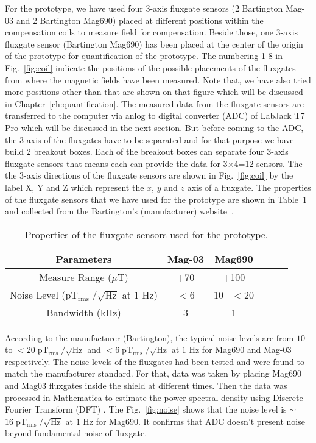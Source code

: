 For the prototype, we have used four 3-axis fluxgate sensors (2 Bartington Mag-03 and 2 Bartington Mag690) placed at different positions within the compensation coils to measure field for compensation. Beside those, one 3-axis fluxgate sensor (Bartington Mag690) has been placed at the center of the origin of the prototype for quantification of the prototype. The numbering 1-8 in Fig.~\ref{fig:coil} indicate the positions of the possible placements of the fluxgates from where the magnetic fields have been measured. Note that, we have also tried more positions other than that are shown on that figure which will be discussed in Chapter~\ref{ch:quantification}.  The measured data from the fluxgate sensors are transferred to the computer via anlog to digital converter (ADC) of LabJack T7 Pro which will be discussed in the next section. But before coming to the ADC, the 3-axis of the fluxgates have to be separated and for that purpose we have build  2 breakout boxes. Each of the breakout boxes can separate four 3-axis fluxgate sensors that means each can provide the data for 3$\times$4=12 sensors. The the 3-axis directions of the fluxgate sensors are shown in Fig.~\ref{fig:coil} by the label X, Y and Z which represent the $x$, $y$ and $z$ axis of a fluxgate.  The properties of the fluxgate sensors that we have used for the prototype are shown in Table~\ref{tablE:sensor} and collected from the Bartington's (manufacturer) website~\cite{flux}. 

\begin{table} [!htb]
    \centering
    \begin{tabular} { |c|c|c|c|c|c|} 
        \hline
        Parameters & Mag-03 & Mag690 \\
        \hline\hline
        Measure Range ($\mu$T) & $\pm$70 & $\pm$100 \\ 
        \hline
        \makecell{Noise Level \\($\mathrm{pT_{rms}\;/\sqrt{Hz}}$ at 1 Hz)} & $<$6 & 10$-<$20 \\ 
        \hline
        Bandwidth (kHz) & 3 & 1 \\ 
        \hline

    \end{tabular}
    \caption{Properties of the fluxgate sensors used for the prototype.}\label{tablE:sensor}
\end{table}

\FloatBarrier
According to the manufacturer (Bartington), the typical noise levels are from $\mathrm{10}$ to $\mathrm{<20\;pT_{rms}\;/\sqrt{Hz}}$ and $\mathrm{<6 \; pT_{rms} \;/\sqrt{Hz}}$ at $\mathrm{1}$ Hz for Mag690 and Mag-03 respectively. The noise levels of the fluxgates had been tested  and were found to match the manufacturer standard. For that, data was taken by placing Mag690 and Mag03 fluxgates inside the shield at different times. Then the data was processed in Mathematica \cite{Mathematica} to estimate the power spectral density using Discrete Fourier Transform (DFT) \cite{dft}. The Fig.~\ref{fig:noise} shows that the noise level is $\sim$ $\mathrm{16\;pT_{rms}\;/\sqrt{Hz}}$ at $\mathrm{1}$ Hz for Mag690. It confirms that ADC doesn't present noise beyond fundamental noise of fluxgate.

